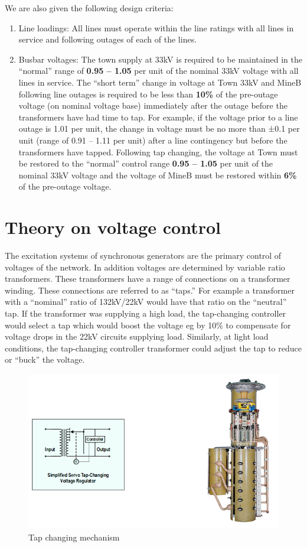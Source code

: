 \documentclass[paper=a4, fontsize=11pt]{article}
\begin{document}
We are also given the following design criteria:
\begin{enumerate}
\item{Line loadings: All lines must operate within the line ratings with all lines in service and following outages of each of the lines.}
\item{Busbar voltages: The town supply at 33kV is required to be maintained in the “normal” range of \textbf{0.95 – 1.05} per unit of the nominal 33kV voltage with all lines in service. The ``short term'' change in voltage at Town 33kV and MineB following line outages is required to be less than \textbf{10\%} of the pre-outage voltage (on nominal voltage base) immediately after the outage before the transformers have had time to tap.  For example, if the voltage prior to a line outage is 1.01 per unit, the change in voltage must be no more than ±0.1 per unit (range of 0.91 – 1.11 per unit) after a line contingency but before the transformers have tapped. Following tap changing, the voltage at Town must be restored to the ``normal'' control range \textbf{0.95 – 1.05} per unit of the nominal 33kV voltage and the voltage of MineB must be restored within \textbf{6\%} of the pre-outage voltage.
}
\end{enumerate}


\section{Theory on voltage control}
The excitation systems of synchronous generators are the primary control of voltages of the network. In addition voltages are determined by variable ratio transformers.  These transformers have a range of connections on a transformer winding.   These connections are referred to as “taps.” For example a transformer with a “nominal” ratio of 132kV/22kV would have that ratio on the “neutral” tap.  If the transformer was supplying a  high load, the  tap-changing controller would select a tap which would boost the voltage eg by 10\% to compensate for voltage drops in the 22kV circuits supplying load.  Similarly, at light load conditions, the tap-changing controller transformer could adjust the tap to reduce or “buck” the voltage.

\begin{figure}[h]
\centering
\includegraphics[width=0.5\linewidth]{fig2_tap.png}
\caption{Tap changing mechanism}
\label{fig:7}
\end{figure}
\end{document}
